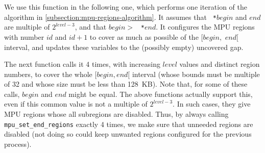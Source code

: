 
We use this function in the following one, which performs one iteration of the
algorithm in \cref{subsection:mpu-regions-algorithm}. It assumes that {\tt
*}$\mathit{begin}$ and {\tt *}$\mathit{end}$ are multiple of
$2^{\mathit{level}-3}$, and that {\tt *}$\mathit{begin} >$ {\tt
*}$\mathit{end}$. It configures the MPU regions with number $\mathit{id}$ and
$\mathit{id}+1$ to cover as much as possible of the $[${\tt *}$\mathit{begin},$
{\tt *}$\mathit{end}[$ interval, and updates these variables to the (possibly
empty) uncovered gap.


The next function calls it 4 times, with increasing $\mathit{level}$ values and
distinct region numbers, to cover the whole $[\mathit{begin}, \mathit{end}[$
interval (whose bounds must be multiple of 32 and whose size must be less than
128~KB). Note that, for some of these calls, $\mathit{begin}$ and
$\mathit{end}$ might be equal. The above functions actually support this, even
if this common value is not a multiple of $2^{\mathit{level}-3}$. In such
cases, they give MPU regions whose all subregions are disabled. Thus, by always
calling {\tt mpu\_set\_end\_regions} exactly 4 times, we make sure that
unneeded regions are disabled (not doing so could keep unwanted regions
configured for the previous process).


